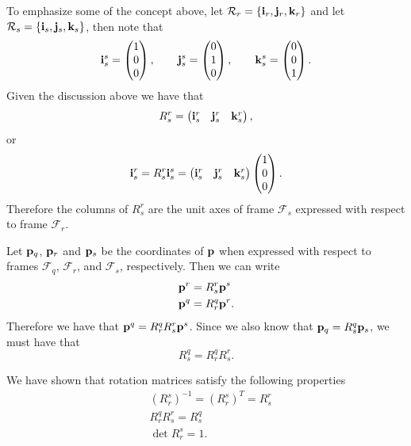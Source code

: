 To emphasize some of the concept above, let $\mathcal{R}_r = \{\mathbf{i}_r, \mathbf{j}_r, \mathbf{k}_r\}$ and let $\mathcal{R}_s = \{\mathbf{i}_s, \mathbf{j}_s, \mathbf{k}_s\}$, 
then note that 
\[
\mathbf{i}_s^s = \begin{pmatrix} 1 \\ 0 \\ 0 \end{pmatrix}, \qquad 
\mathbf{j}_s^s = \begin{pmatrix} 0 \\ 1 \\ 0 \end{pmatrix}, \qquad 
\mathbf{k}_s^s = \begin{pmatrix} 0 \\ 0 \\ 1 \end{pmatrix}.
\]
Given the discussion above we have that
\[
R_s^r = \begin{pmatrix} \mathbf{i}_s^r & \mathbf{j}_s^r & \mathbf{k}_s^r \end{pmatrix},
\]
or 
\[
\mathbf{i}_s^r = R_s^r \mathbf{i}_s^s = \begin{pmatrix} \mathbf{i}_s^r & \mathbf{j}_s^r & \mathbf{k}_s^r \end{pmatrix} \begin{pmatrix} 1 \\ 0 \\ 0 \end{pmatrix}.
\]
Therefore the columns of $R_s^r$ are the unit axes of frame $\mathcal{F}_s$ expressed with respect to frame $\mathcal{F}_r$.

Let $\mathbf{p}_q$, $\mathbf{p}_r$ and $\mathbf{p}_s$ be the coordinates of $\mathbf{p}$ when expressed with respect to frames $\mathcal{F}_q$, $\mathcal{F}_r$, and $\mathcal{F}_s$, respectively. Then we can write
\begin{align*}
\mathbf{p}^r &= R_s^r \mathbf{p}^s \\
\mathbf{p}^q &= R_r^q \mathbf{p}^r.
\end{align*}
Therefore we have that $\mathbf{p}^q = R_r^q R_s^r \mathbf{p}^s$.  Since we also know that $\mathbf{p}_q = R_s^q \mathbf{p}_s$, we must have that
\[
R_s^q = R_r^q R_s^r.
\]

We have shown that rotation matrices satisfy the following properties
\begin{align}
& (R_r^s)^{-1} = (R_r^s)^T = R_s^r \label{eq:rotations_matrics_1} \\
& R_r^q R_s^r = R_s^q \label{eq:rotations_matrics_2} \\
& \det{R_r^s} = 1. \label{eq:rotations_matrics_3}
\end{align}


